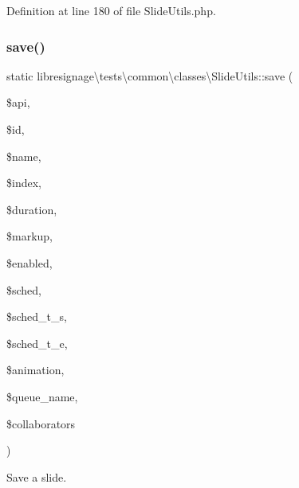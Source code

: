 Definition at line 180 of file Slide\+Utils.\+php.

\mbox{\label{classlibresignage_1_1tests_1_1common_1_1classes_1_1SlideUtils_aeeef7df2a56d96fdb8455b40abd6b28c}} 
\subsubsection{\texorpdfstring{save()}{save()}}
{\footnotesize\ttfamily static libresignage\textbackslash{}tests\textbackslash{}common\textbackslash{}classes\textbackslash{}\+Slide\+Utils\+::save (\begin{DoxyParamCaption}\item[{\hyperlink{classlibresignage_1_1tests_1_1common_1_1classes_1_1APIInterface}{A\+P\+I\+Interface}}]{\$api,  }\item[{}]{\$id,  }\item[{string}]{\$name,  }\item[{int}]{\$index,  }\item[{int}]{\$duration,  }\item[{string}]{\$markup,  }\item[{bool}]{\$enabled,  }\item[{bool}]{\$sched,  }\item[{int}]{\$sched\+\_\+t\+\_\+s,  }\item[{int}]{\$sched\+\_\+t\+\_\+e,  }\item[{int}]{\$animation,  }\item[{string}]{\$queue\+\_\+name,  }\item[{array}]{\$collaborators }\end{DoxyParamCaption})\hspace{0.3cm}{\ttfamily [static]}}

Save a slide.


